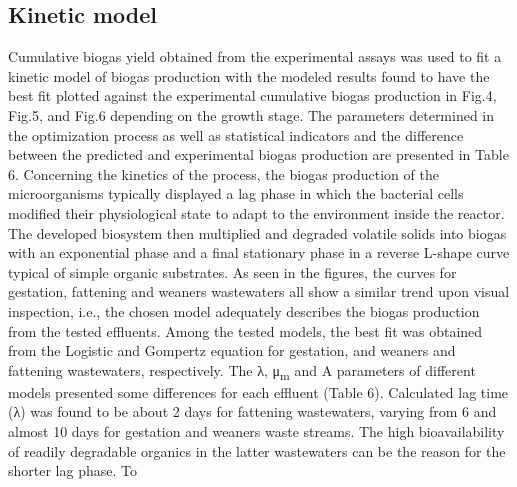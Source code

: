 \subsection{Kinetic model}
Cumulative biogas yield obtained from the experimental assays was used to fit a kinetic model of biogas production with the modeled results found to have the best fit plotted against the experimental cumulative biogas production in Fig.4, Fig.5, and Fig.6 depending on the growth stage. The parameters determined in the optimization process as well as statistical indicators and the difference between the predicted and experimental biogas production are presented in Table 6.
Concerning the kinetics of the process, the biogas production of the microorganisms typically displayed a lag phase in which the bacterial cells modified their physiological state to adapt to the environment inside the reactor. The developed biosystem then multiplied and degraded volatile solids into biogas with an exponential phase and a final stationary phase in a reverse L-shape curve typical of simple organic substrates. As seen in the figures, the curves for gestation, fattening and weaners wastewaters all show a similar trend upon visual inspection, i.e., the chosen model adequately describes the biogas production from the tested effluents. Among the tested models, the best fit was obtained from the Logistic and Gompertz equation for gestation, and weaners and fattening wastewaters, respectively. The λ, μ\textsubscript{m} and A  parameters of different models presented some differences for each effluent (Table 6). Calculated lag time (λ) was found to be about 2 days for fattening wastewaters, varying from 6 and almost 10 days for gestation and weaners waste streams. The high bioavailability of readily degradable organics in the latter wastewaters can be the reason for the shorter lag phase.  To